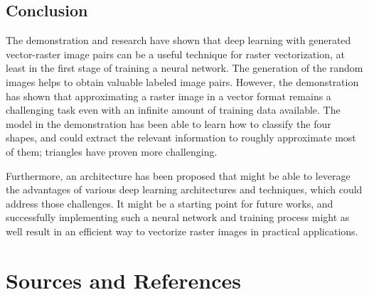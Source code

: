 \documentclass[12pt, a4paper, titlepage]{report}
\begin{document}
\pagebreak
\section{Conclusion}

The demonstration and research have shown that deep learning with generated vector-raster image pairs can be a useful technique for raster vectorization, at least in the first stage of training a neural network. The generation of the random images helps to obtain valuable labeled image pairs.
However, the demonstration has shown that approximating a raster image in a vector format remains a challenging task even with an infinite amount of training data available. The model in the demonstration has been able to learn how to classify the four shapes, and could extract the relevant information to roughly approximate most of them; triangles have proven more challenging.

Furthermore, an architecture has been proposed that might be able to leverage the advantages of various deep learning architectures and techniques, which could address those challenges. It might be a starting point for future works, and successfully implementing such a neural network and training process might as well result in an efficient way to vectorize raster images in practical applications.





\chapter{Sources and References}

\nocite{*}  %

\begin{refcontext}[labelprefix=T]
   \printbibliography[type=misc, keyword={TextResource}, title={Text Sources and References}]
\end{refcontext}

\begin{refcontext}[labelprefix=I]
  \printbibliography[type=misc, keyword={ImageResource}, title={Image Resources}]
\end{refcontext}

\begin{refcontext}[labelprefix=A]
   \printbibliography[type=misc, keyword={AITool}, title={AI Tools}]
\end{refcontext}
\end{document}
